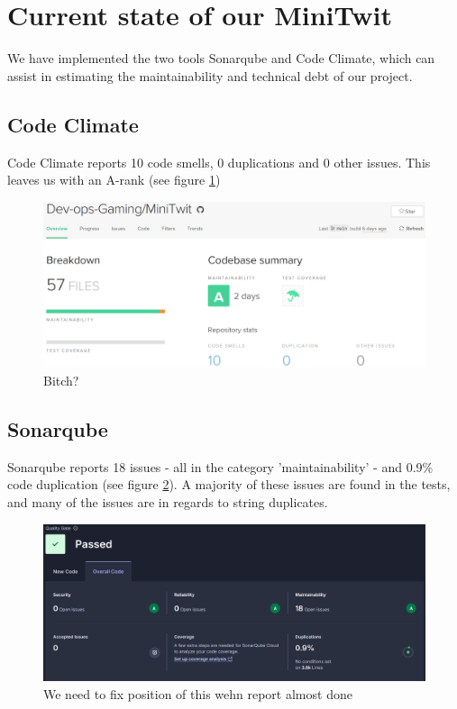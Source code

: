 \section{Current state of our MiniTwit}
We have implemented the two tools Sonarqube and Code Climate, which can assist in estimating the maintainability and technical debt of our project.
\subsection{Code Climate}
Code Climate reports 10 code smells, 0 duplications and 0 other issues. This leaves us with an A-rank (see figure \ref{fig:CodeClimate})\\
\begin{figure}[h]
\centering
\includegraphics[width=\textwidth]{images/code_climate.png}
\caption{Bitch?}
\label{fig:CodeClimate}
\end{figure}

\subsection{Sonarqube}
Sonarqube reports 18 issues - all in the category 'maintainability' - and 0.9\% code duplication (see figure \ref{fig:SonarQube}). A majority of these issues are found in the tests, and many of the issues are in regards to string duplicates.
\begin{figure}[h]
\centering
\includegraphics[width=\textwidth]{images/sonarQube.png}
\caption{We need to fix position of this wehn report almost done}
\label{fig:SonarQube}
\end{figure}
